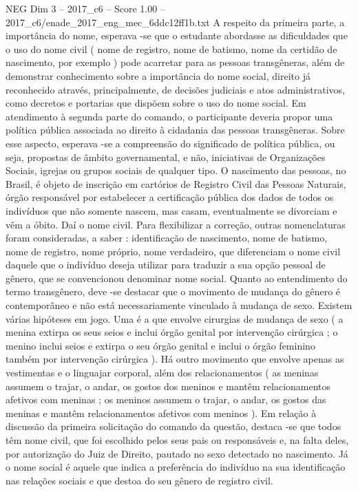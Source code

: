 \begin{textsample}{NEG Dim 3 – 2017\_c6 – Score 1.00 – 2017\_c6/enade\_2017\_eng\_mec\_6ddc12ff1b.txt}
A respeito da primeira parte, a importância do nome, esperava -se que o estudante abordasse as dificuldades que o uso do nome civil ( nome de registro, nome de batismo, nome da certidão de nascimento, por exemplo ) pode acarretar para as pessoas transgêneras, além de demonstrar conhecimento sobre a importância do nome social, direito já reconhecido através, principalmente, de decisões judiciais e atos administrativos, como decretos e portarias que dispõem sobre o uso do nome social.
Em atendimento à segunda parte do comando, o participante deveria propor uma política pública associada ao direito à cidadania das pessoas transgêneras.
Sobre esse aspecto, esperava -se a compreensão do significado de política pública, ou seja, propostas de âmbito governamental, e não, iniciativas de Organizações Sociais, igrejas ou grupos sociais de qualquer tipo.
O nascimento das pessoas, no Brasil, é objeto de inscrição em cartórios de Registro Civil das Pessoas Naturais, órgão responsável por estabelecer a certificação pública dos dados de todos os indivíduos que não somente nascem, mas casam, eventualmente se divorciam e vêm a óbito.
Daí o nome civil.
Para flexibilizar a correção, outras nomenclaturas foram consideradas, a saber : identificação de nascimento, nome de batismo, nome de registro, nome próprio, nome verdadeiro, que diferenciam o nome civil daquele que o indivíduo deseja utilizar para traduzir a sua opção pessoal de gênero, que se convencionou denominar nome social.
Quanto ao entendimento do termo transgênero, deve -se destacar que o movimento de mudança do gênero é contemporâneo e não está necessariamente vinculado à mudança de sexo.
Existem várias hipóteses em jogo.
Uma é a que envolve cirurgias de mudança de sexo ( a menina extirpa os seus seios e inclui órgão genital por intervenção cirúrgica ; o menino inclui seios e extirpa o seu órgão genital e inclui o órgão feminino também por intervenção cirúrgica ).
Há outro movimento que envolve apenas as vestimentas e o linguajar corporal, além dos relacionamentos ( as meninas assumem o trajar, o andar, os gostos dos meninos e mantêm relacionamentos afetivos com meninas ; os meninos assumem o trajar, o andar, os gostos das meninas e mantêm relacionamentos afetivos com meninos ).
Em relação à discussão da primeira solicitação do comando da questão, destaca -se que todos têm nome civil, que foi escolhido pelos seus pais ou responsáveis e, na falta deles, por autorização do Juiz de Direito, pautado no sexo detectado no nascimento.
Já o nome social é aquele que indica a preferência do indivíduo na sua identificação nas relações sociais e que destoa do seu gênero de registro civil.

\end{textsample}
